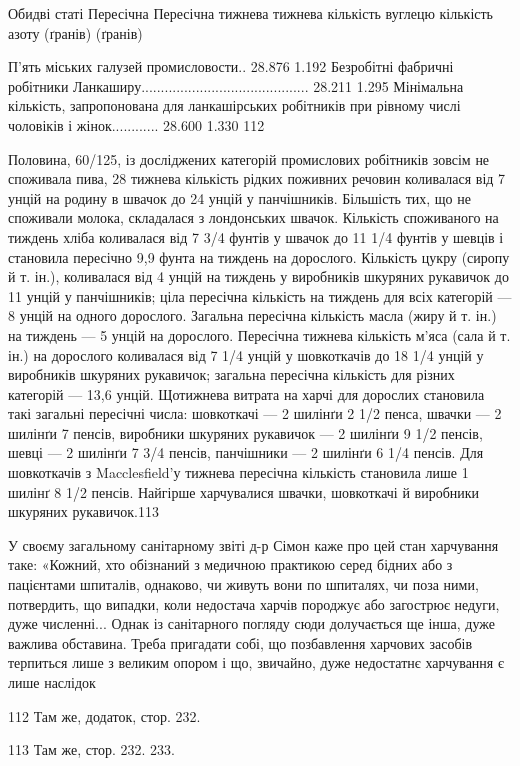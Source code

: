 Обидві статі                                                        Пересічна                       
       Пересічна
                                                                                тижнева             
                    тижнева
                                                                                кількість вуглецю   
            кількість азоту
                                                                                (ґранів)            
                      (ґранів)

П’ять міських галузей промисловости..     28.876                                      1.192
Безробітні фабричні робітники
Ланкаширу...........................................     28.211                                     
1.295
Мінімальна кількість, запропонована
для ланкашірських робітників при
рівному числі чоловіків і жінок............      28.600                                      1.330
112

Половина, 60/125, із досліджених категорій промислових робітників
зовсім не споживала пива, 28%
тижнева кількість рідких поживних речовин коливалася від
7 унцій на родину в швачок до 24 унцій у панчішників. Більшість
тих, що не споживали молока, складалася з лондонських
швачок. Кількість споживаного на тиждень хліба коливалася
від 7 3/4 фунтів у швачок до 11 1/4 фунтів у шевців і становила пересічно
9,9 фунта на тиждень на дорослого. Кількість цукру (сиропу
й т. ін.), коливалася від 4 унцій на тиждень у виробників
шкуряних рукавичок до 11 унцій у панчішників; ціла пересічна
кількість на тиждень для всіх категорій — 8 унцій на одного
дорослого. Загальна пересічна кількість масла (жиру й т. ін.)
на тиждень — 5 унцій на дорослого. Пересічна тижнева кількість
м’яса (сала й т. ін.) на дорослого коливалася від 7 1/4 унцій у шовкоткачів
до 18 1/4 унцій у виробників шкуряних рукавичок;
загальна пересічна кількість для різних категорій — 13,6 унцій.
Щотижнева витрата на харчі для дорослих становила такі загальні
пересічні числа: шовкоткачі — 2 шилінґи 2 1/2 пенса,
швачки — 2 шилінґи 7 пенсів, виробники шкуряних рукавичок
— 2 шилінґи 9 1/2 пенсів, шевці — 2 шилінґи 7 3/4 пенсів,
панчішники — 2 шилінґи 6 1/4 пенсів. Для шовкоткачів з Macclesfield’у
тижнева пересічна кількість становила лише 1 шилінґ
8 1/2 пенсів. Найгірше харчувалися швачки, шовкоткачі й виробники
шкуряних рукавичок.113

У своєму загальному санітарному звіті д-р Сімон каже про
цей стан харчування таке: «Кожний, хто обізнаний з медичною
практикою серед бідних або з пацієнтами шпиталів, однаково,
чи живуть вони по шпиталях, чи поза ними, потвердить, що випадки,
коли недостача харчів породжує або загострює недуги,
дуже численні... Однак із санітарного погляду сюди долучається
ще інша, дуже важлива обставина. Треба пригадати собі, що
позбавлення харчових засобів терпиться лише з великим опором
і що, звичайно, дуже недостатнє харчування є лише наслідок

112 Там же, додаток, стор. 232.

113 Там же, стор. 232. 233.
